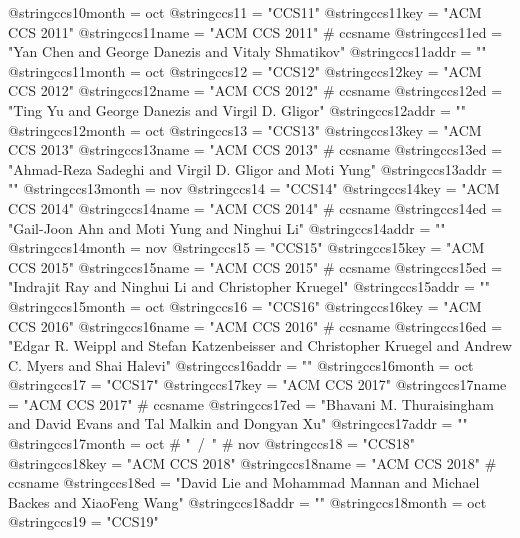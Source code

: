 @string{ccs10month =            oct}
@string{ccs11 =                 "CCS11"}
@string{ccs11key =              "ACM CCS 2011"}
@string{ccs11name =             "ACM CCS 2011" # ccsname}
@string{ccs11ed =               "Yan Chen and George Danezis and Vitaly Shmatikov"}
@string{ccs11addr =             ""}
@string{ccs11month =            oct}
@string{ccs12 =                 "CCS12"}
@string{ccs12key =              "ACM CCS 2012"}
@string{ccs12name =             "ACM CCS 2012" # ccsname}
@string{ccs12ed =               "Ting Yu and George Danezis and Virgil D. Gligor"}
@string{ccs12addr =             ""}
@string{ccs12month =            oct}
@string{ccs13 =                 "CCS13"}
@string{ccs13key =              "ACM CCS 2013"}
@string{ccs13name =             "ACM CCS 2013" # ccsname}
@string{ccs13ed =               "Ahmad-Reza Sadeghi and Virgil D. Gligor and Moti Yung"}
@string{ccs13addr =             ""}
@string{ccs13month =            nov}
@string{ccs14 =                 "CCS14"}
@string{ccs14key =              "ACM CCS 2014"}
@string{ccs14name =             "ACM CCS 2014" # ccsname}
@string{ccs14ed =               "Gail-Joon Ahn and Moti Yung and Ninghui Li"}
@string{ccs14addr =             ""}
@string{ccs14month =            nov}
@string{ccs15 =                 "CCS15"}
@string{ccs15key =              "ACM CCS 2015"}
@string{ccs15name =             "ACM CCS 2015" # ccsname}
@string{ccs15ed =               "Indrajit Ray and Ninghui Li and Christopher Kruegel"}
@string{ccs15addr =             ""}
@string{ccs15month =            oct}
@string{ccs16 =                 "CCS16"}
@string{ccs16key =              "ACM CCS 2016"}
@string{ccs16name =             "ACM CCS 2016" # ccsname}
@string{ccs16ed =               "Edgar R. Weippl and Stefan Katzenbeisser and Christopher Kruegel and Andrew C. Myers and Shai Halevi"}
@string{ccs16addr =             ""}
@string{ccs16month =            oct}
@string{ccs17 =                 "CCS17"}
@string{ccs17key =              "ACM CCS 2017"}
@string{ccs17name =             "ACM CCS 2017" # ccsname}
@string{ccs17ed =               "Bhavani M. Thuraisingham and David Evans and Tal Malkin and Dongyan Xu"}
@string{ccs17addr =             ""}
@string{ccs17month =            oct # "~/~" # nov}
@string{ccs18 =                 "CCS18"}
@string{ccs18key =              "ACM CCS 2018"}
@string{ccs18name =             "ACM CCS 2018" # ccsname}
@string{ccs18ed =               "David Lie and Mohammad Mannan and Michael Backes and XiaoFeng Wang"}
@string{ccs18addr =             ""}
@string{ccs18month =            oct}
@string{ccs19 =                 "CCS19"}
